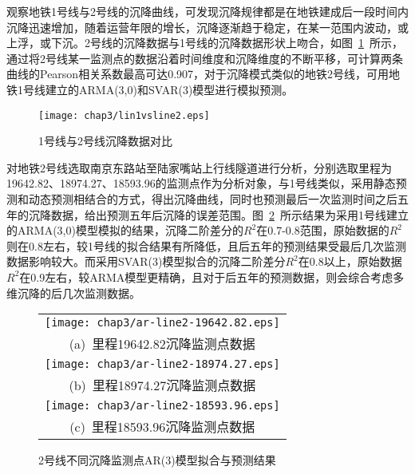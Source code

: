 观察地铁1号线与2号线的沉降曲线，可发现沉降规律都是在地铁建成后一段时间内沉降迅速增加，随着运营年限的增长，沉降逐渐趋于稳定，在某一范围内波动，或上浮，或下沉。2号线的沉降数据与1号线的沉降数据形状上吻合，如图~\ref{fig:1号线与2号线沉降数据对比}~所示，通过将2号线某一监测点的数据沿着时间维度和沉降维度的不断平移，可计算两条曲线的Pearson相关系数最高可达0.907，对于沉降模式类似的地铁2号线，可用地铁1号线建立的ARMA(3,0)和SVAR(3)模型进行模拟预测。

\begin{figure}[htb!]
    \centering
    \texttt{[image: chap3/lin1vsline2.eps]}
    \caption{1号线与2号线沉降数据对比}
    \label{fig:1号线与2号线沉降数据对比}
\end{figure}

对地铁2号线选取南京东路站至陆家嘴站上行线隧道进行分析，分别选取里程为19642.82、18974.27、18593.96的监测点作为分析对象，与1号线类似，采用静态预测和动态预测相结合的方式，得出沉降曲线，同时也预测最后一次监测时间之后五年的沉降数据，给出预测五年后沉降的误差范围。图~\ref{fig:2号线不同沉降监测点AR3模型拟合与预测结果}~所示结果为采用1号线建立的ARMA(3,0)模型模拟的结果，沉降二阶差分的$R^2$在0.7-0.8范围，原始数据的$R^2$则在0.8左右，较1号线的拟合结果有所降低，且后五年的预测结果受最后几次监测数据影响较大。而采用SVAR(3)模型拟合的沉降二阶差分$R^2$在0.8以上，原始数据$R^2$在0.9左右，较ARMA模型更精确，且对于后五年的预测数据，则会综合考虑多维沉降的后几次监测数据。

\begin{figure}[htbp] 
    \centering 
    \begin{tabular}{c} 
        \texttt{[image: chap3/ar-line2-19642.82.eps]} \\ 
        (a)~里程19642.82沉降监测点数据 \\
        \texttt{[image: chap3/ar-line2-18974.27.eps]} \\ 
        (b)~里程18974.27沉降监测点数据 \\
        \texttt{[image: chap3/ar-line2-18593.96.eps]} \\ 
        (c)~里程18593.96沉降监测点数据 \\
    \end{tabular}
    \caption{2号线不同沉降监测点AR(3)模型拟合与预测结果} 
    \label{fig:2号线不同沉降监测点AR3模型拟合与预测结果} 
\end{figure}

